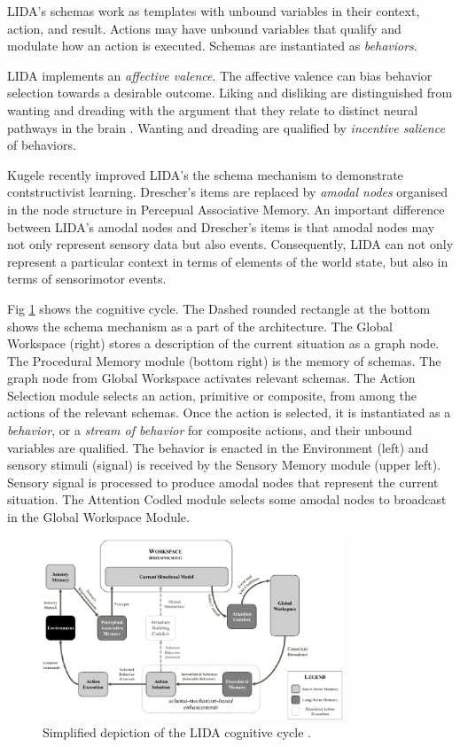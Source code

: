 \documentclass[runningheads]{llncs}
\begin{document}
LIDA's schemas work as templates with unbound variables in their context, action, and result. 
Actions may have  unbound variables that qualify and modulate how an action is executed. 
Schemas are instantiated as \textit{behaviors}. 

LIDA implements an \textit{affective valence}. 
The affective valence can bias behavior selection towards a desirable outcome. 
Liking and disliking are distinguished from wanting and dreading with the argument that they relate to distinct neural pathways in the brain \cite{kringelbach_functional_2010}. 
Wanting and dreading are qualified by \textit{incentive salience} of behaviors.   

Kugele \cite{kugele2025_constructivist} recently improved LIDA's the schema mechanism to demonstrate contstructivist learning.
Drescher's items are replaced by \textit{amodal nodes} organised in the node structure in Percepual Associative Memory. 
An important difference between LIDA's amodal nodes and Drescher's items is that amodal nodes may not only represent sensory data but also events. 
Consequently, LIDA can not only represent a particular context in terms of elements of the world state, but also in terms of sensorimotor events. 

Fig \ref{fig:lida} shows the cognitive cycle. 
The Dashed rounded rectangle at the bottom shows the schema mechanism as a part of the architecture. 
The Global Workspace (right) stores a description of the current situation as a graph node. 
The Procedural Memory module (bottom right) is the memory of schemas. 
The graph node from Global Workspace activates relevant schemas. 
The Action Selection module selects an action, primitive or composite, from among the actions of the relevant schemas. 
Once the action is selected, it is instantiated as a \textit{behavior}, or a \textit{stream of behavior} for composite actions, and their unbound variables are qualified. 
The behavior is enacted in the Environment (left) and sensory stimuli (signal) is received by the Sensory Memory module (upper left).
Sensory signal is processed to produce amodal nodes that represent the current situation. 
The Attention Codled module selects some amodal nodes to broadcast in the Global Workspace Module. 

\begin{figure}
	\centering
	\includegraphics[width=0.8\textwidth]{Figure_LIDA.png}
	\caption{Simplified depiction of the LIDA cognitive cycle \cite[Fig. 4]{kugele2025_constructivist}.
	} 
	\label{fig:lida}
\end{figure}
\end{document}
